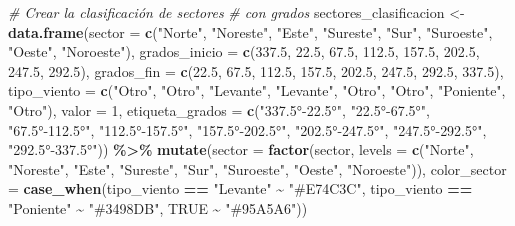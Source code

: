 \documentclass[
]{article}
\newenvironment{Shaded}{\begin{snugshade}}{\end{snugshade}}
\newcommand{\AttributeTok}[1]{\textcolor[rgb]{0.13,0.29,0.53}{#1}}
\newcommand{\CommentTok}[1]{\textcolor[rgb]{0.56,0.35,0.01}{\textit{#1}}}
\newcommand{\ConstantTok}[1]{\textcolor[rgb]{0.56,0.35,0.01}{#1}}
\newcommand{\DecValTok}[1]{\textcolor[rgb]{0.00,0.00,0.81}{#1}}
\newcommand{\FloatTok}[1]{\textcolor[rgb]{0.00,0.00,0.81}{#1}}
\newcommand{\FunctionTok}[1]{\textcolor[rgb]{0.13,0.29,0.53}{\textbf{#1}}}
\newcommand{\NormalTok}[1]{#1}
\newcommand{\OtherTok}[1]{\textcolor[rgb]{0.56,0.35,0.01}{#1}}
\newcommand{\SpecialCharTok}[1]{\textcolor[rgb]{0.81,0.36,0.00}{\textbf{#1}}}
\newcommand{\StringTok}[1]{\textcolor[rgb]{0.31,0.60,0.02}{#1}}
\begin{document}
\begin{Shaded}
\begin{Highlighting}[]
\CommentTok{\# Crear la clasificación de sectores}
\CommentTok{\# con grados}
\NormalTok{sectores\_clasificacion }\OtherTok{\textless{}{-}} \FunctionTok{data.frame}\NormalTok{(}\AttributeTok{sector =} \FunctionTok{c}\NormalTok{(}\StringTok{"Norte"}\NormalTok{,}
    \StringTok{"Noreste"}\NormalTok{, }\StringTok{"Este"}\NormalTok{, }\StringTok{"Sureste"}\NormalTok{, }\StringTok{"Sur"}\NormalTok{,}
    \StringTok{"Suroeste"}\NormalTok{, }\StringTok{"Oeste"}\NormalTok{, }\StringTok{"Noroeste"}\NormalTok{), }\AttributeTok{grados\_inicio =} \FunctionTok{c}\NormalTok{(}\FloatTok{337.5}\NormalTok{,}
    \FloatTok{22.5}\NormalTok{, }\FloatTok{67.5}\NormalTok{, }\FloatTok{112.5}\NormalTok{, }\FloatTok{157.5}\NormalTok{, }\FloatTok{202.5}\NormalTok{, }\FloatTok{247.5}\NormalTok{,}
    \FloatTok{292.5}\NormalTok{), }\AttributeTok{grados\_fin =} \FunctionTok{c}\NormalTok{(}\FloatTok{22.5}\NormalTok{, }\FloatTok{67.5}\NormalTok{, }\FloatTok{112.5}\NormalTok{,}
    \FloatTok{157.5}\NormalTok{, }\FloatTok{202.5}\NormalTok{, }\FloatTok{247.5}\NormalTok{, }\FloatTok{292.5}\NormalTok{, }\FloatTok{337.5}\NormalTok{), }\AttributeTok{tipo\_viento =} \FunctionTok{c}\NormalTok{(}\StringTok{"Otro"}\NormalTok{,}
    \StringTok{"Otro"}\NormalTok{, }\StringTok{"Levante"}\NormalTok{, }\StringTok{"Levante"}\NormalTok{, }\StringTok{"Otro"}\NormalTok{,}
    \StringTok{"Otro"}\NormalTok{, }\StringTok{"Poniente"}\NormalTok{, }\StringTok{"Otro"}\NormalTok{), }\AttributeTok{valor =} \DecValTok{1}\NormalTok{,}
    \AttributeTok{etiqueta\_grados =} \FunctionTok{c}\NormalTok{(}\StringTok{"337.5°{-}22.5°"}\NormalTok{,}
        \StringTok{"22.5°{-}67.5°"}\NormalTok{, }\StringTok{"67.5°{-}112.5°"}\NormalTok{,}
        \StringTok{"112.5°{-}157.5°"}\NormalTok{, }\StringTok{"157.5°{-}202.5°"}\NormalTok{,}
        \StringTok{"202.5°{-}247.5°"}\NormalTok{, }\StringTok{"247.5°{-}292.5°"}\NormalTok{,}
        \StringTok{"292.5°{-}337.5°"}\NormalTok{)) }\SpecialCharTok{\%\textgreater{}\%}
    \FunctionTok{mutate}\NormalTok{(}\AttributeTok{sector =} \FunctionTok{factor}\NormalTok{(sector, }\AttributeTok{levels =} \FunctionTok{c}\NormalTok{(}\StringTok{"Norte"}\NormalTok{,}
        \StringTok{"Noreste"}\NormalTok{, }\StringTok{"Este"}\NormalTok{, }\StringTok{"Sureste"}\NormalTok{, }\StringTok{"Sur"}\NormalTok{,}
        \StringTok{"Suroeste"}\NormalTok{, }\StringTok{"Oeste"}\NormalTok{, }\StringTok{"Noroeste"}\NormalTok{)),}
        \AttributeTok{color\_sector =} \FunctionTok{case\_when}\NormalTok{(tipo\_viento }\SpecialCharTok{==}
            \StringTok{"Levante"} \SpecialCharTok{\textasciitilde{}} \StringTok{"\#E74C3C"}\NormalTok{, tipo\_viento }\SpecialCharTok{==}
            \StringTok{"Poniente"} \SpecialCharTok{\textasciitilde{}} \StringTok{"\#3498DB"}\NormalTok{, }\ConstantTok{TRUE} \SpecialCharTok{\textasciitilde{}}
            \StringTok{"\#95A5A6"}\NormalTok{))}


\end{Highlighting}
\end{Shaded}
\end{document}
